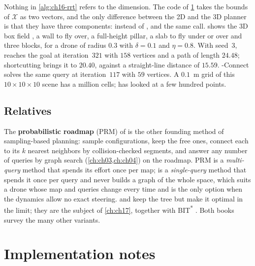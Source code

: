 Nothing in \cref{alg:ch16-rrt} refers to the dimension. The code of
\cref{sec:ch16-implementation} takes the bounds of $\mathcal{X}$ as two
vectors, and the only difference between the 2D and the 3D planner is that
they have three components:  instead of , and the
same  call.  shows the 3D box field
, a wall to fly over, a full-height pillar, a slab to fly
under or over and three blocks, for a drone of radius $0.3$ with
$\delta=0.1$ and $\eta=0.8$. With seed~3, \rrt reaches the goal at
iteration~$321$ with $158$ vertices and a path of length $24.48$;
shortcutting brings it to $20.40$, against a straight-line distance of
$15.59$. \rrt-Connect solves the same query at iteration~$117$ with $59$
vertices. A $0.1$~m grid of this $10\times10\times10$ scene has a million
cells; \rrt has looked at a few hundred points.

\subsection{Relatives}
\label{sec:ch16-relatives}

The \textbf{probabilistic roadmap} (PRM)
of \textcite{kavraki1996prm} is the other founding method of sampling-based
planning: sample configurations, keep the free ones, connect each to its $k$
nearest neighbors by collision-checked segments, and answer any number of
queries by graph search (\cref{ch:ch03,ch:ch04}) on the roadmap. PRM is a
\emph{multi-query} method that spends its effort once per map; \rrt is a
\emph{single-query} method that spends it once per query and never builds a
graph of the whole space, which suits a drone whose map and queries change
every time and is the only option when the dynamics allow no exact steering.
\rrtstar and \irrtstar \cite{karaman2011sampling,gammell2014informed} keep
the tree but make it optimal in the limit; they are the subject of
\cref{ch:ch17}, together with BIT\textsuperscript{*} \cite{gammell2015bit}.
Both books \cite{lavalle2006planning,choset2005principles} survey the many
other variants.

\section{Implementation notes}
\label{sec:ch16-implementation}

